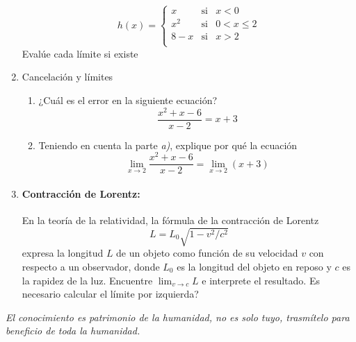 \documentclass[10pt,twoside]{article}
\begin{document}
\begin{enumerate}
\[h(x)=\left\{ \begin{array}{lcl}
x & \mbox{si} & x<0\\
x^{2}  & \mbox{si} & 0<x\leq 2\\
8-x & \mbox{si} & x>2\\
\end{array}
\right.\]
Evalúe cada límite si existe
\begin{enumerate}
\end{enumerate}
\item Cancelación y límites
\begin{enumerate}
\item ¿Cuál es el error en la siguiente ecuación?
\[\dfrac{x^{2}+x-6}{x-2}=x+3\]
\item Teniendo en cuenta la parte \emph{a)}, explique por qué la ecuación
\[\displaystyle{\lim_{x\rightarrow 2}}\dfrac{x^{2}+x-6}{x-2}=\displaystyle{\lim_{x\rightarrow 2}}(x+3)\]
\end{enumerate}
\item \paragraph*{Contracción de Lorentz:} En la teoría de la relatividad, la fórmula de la contracción de Lorentz
\[L=L_{0}\sqrt{1-v^{2}/c^{2}}\]
expresa la longitud $L$ de un objeto como función de su velocidad $v$ con respecto a un observador, donde $L_{0}$ es la longitud del objeto en reposo y $c$ es la rapidez de la luz. Encuentre \hspace*{.5cm} $\displaystyle{\lim_{v\rightarrow c}}L$  \hspace*{.5cm} e interprete el resultado. Es necesario calcular el límite por izquierda?
\end{enumerate}
\vspace*{20pt}
\emph{El conocimiento es patrimonio de la humanidad, no es solo tuyo, trasmítelo para beneficio de toda la humanidad.}
\end{document}
